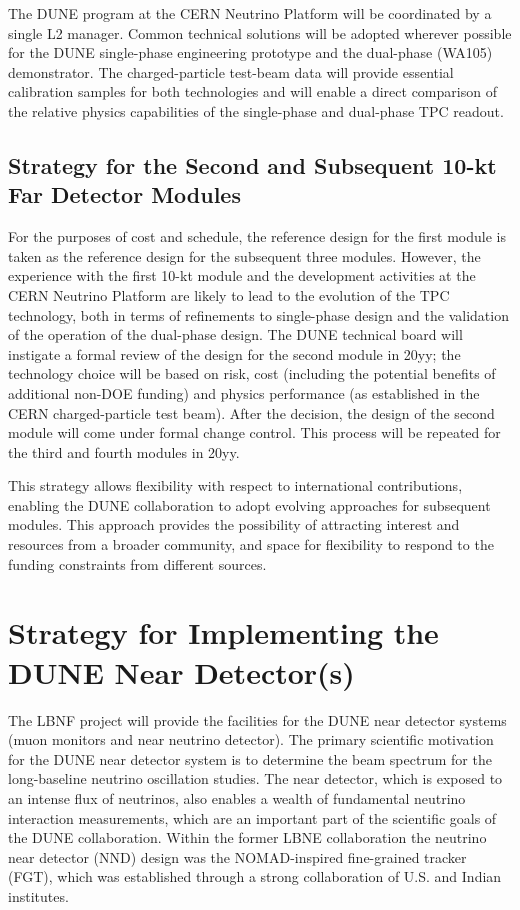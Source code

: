 The DUNE program at the CERN Neutrino Platform will be coordinated by a single 
L2 manager. Common technical solutions will be adopted wherever possible for the 
DUNE single-phase engineering prototype and the dual-phase (WA105) demonstrator. 
The charged-particle test-beam data will provide essential calibration samples 
for both technologies and will enable a direct comparison of the relative physics 
capabilities of the single-phase and dual-phase TPC readout. 

\subsection{Strategy for the Second and Subsequent 10-kt Far Detector Modules}

For the purposes of cost and schedule, the reference design for the first module 
is taken as the reference design for the subsequent three modules. However, 
the experience with the first 10-kt module and the development activities at 
the CERN Neutrino Platform are likely to lead to the evolution of the TPC technology, both 
in terms of refinements to single-phase design and the validation of the operation 
of the dual-phase design. The DUNE technical board will instigate a formal review 
of the design for the second module in 20yy; %
the technology choice 
will be based on risk, cost (including the potential benefits of additional 
non-DOE funding) and physics performance (as established in the CERN charged-particle 
test beam). After the decision, the design of the second module will come under formal 
change control. This process will be repeated for the third and fourth modules 
in 20yy.%

This strategy allows flexibility with respect to international contributions, 
enabling the DUNE collaboration to
adopt evolving approaches for subsequent modules. This approach provides the possibility of attracting interest 
and resources from a broader community, and space for flexibility to respond to 
the funding constraints from different sources. 

\section{Strategy for Implementing the DUNE Near Detector(s)}
\label{v1ch:strategyND}

The LBNF project will provide the facilities for the DUNE near detector systems 
(muon monitors and near neutrino detector). The primary scientific motivation for 
the DUNE near detector system is to determine the beam spectrum for the long-baseline 
neutrino oscillation studies. The near detector, which is exposed to an intense 
flux of neutrinos, also enables a wealth of fundamental neutrino 
interaction measurements, which are an important part of the  scientific 
goals of the DUNE collaboration. Within the former LBNE collaboration the neutrino 
near detector (NND) design was the NOMAD-inspired fine-grained tracker (FGT), which 
was established through a strong collaboration of U.S. and Indian institutes.

